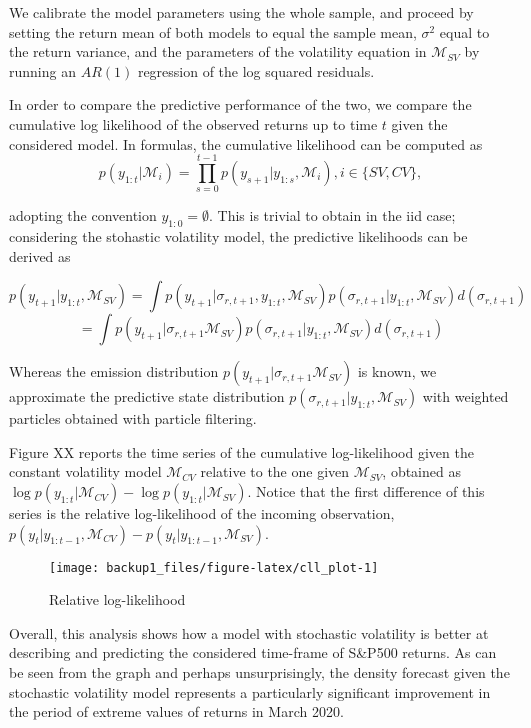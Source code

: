 \documentclass[
]{book}
\theoremstyle{break}
\theoremstyle{nonumberplain}
\begin{document}
We calibrate the model parameters using the whole sample, and proceed by
setting the return mean of both models to equal the sample mean,
\(\sigma^{2}\) equal to the return variance, and the parameters of the
volatility equation in \(\mathcal{M}_{SV}\) by running an \(AR(1)\)
regression of the log squared residuals.

In order to compare the predictive performance of the two, we compare
the cumulative log likelihood of the observed returns up to time \(t\)
given the considered model. In formulas, the cumulative likelihood can
be computed as \[
p(y_{1:t}|\mathcal{M}_{i})=\prod_{s=0}^{t-1}p(y_{s+1}|y_{1:s},\mathcal{M}_{i}),i\in\{SV,CV\},
\]

adopting the convention \(y_{1:0}=\emptyset\). This is trivial to obtain
in the iid case; considering the stohastic volatility model, the
predictive likelihoods can be derived as

\[
p(y_{t+1}|y_{1:t},\mathcal{M}_{SV})=\int p(y_{t+1}|\sigma_{r,t+1},y_{1:t},\mathcal{M}_{SV})p(\sigma_{r,t+1}|y_{1:t},\mathcal{M}_{SV})d(\sigma_{r,t+1})
\] \[
=\int p(y_{t+1}|\sigma_{r,t+1}\mathcal{M}_{SV})p(\sigma_{r,t+1}|y_{1:t},\mathcal{M}_{SV})d(\sigma_{r,t+1})
\]

Whereas the emission distribution
\(p(y_{t+1}|\sigma_{r,t+1}\mathcal{M}_{SV})\) is known, we approximate
the predictive state distribution
\(p(\sigma_{r,t+1}|y_{1:t},\mathcal{M}_{SV})\) with weighted particles
obtained with particle filtering.

Figure XX reports the time series of the cumulative log-likelihood given
the constant volatility model \(\mathcal{M}_{CV}\) relative to the one
given \(\mathcal{M}_{SV}\), obtained as
\(\log p(y_{1:t}|\mathcal{M}_{CV})-\log p(y_{1:t}|\mathcal{M}_{SV})\).
Notice that the first difference of this series is the relative
log-likelihood of the incoming observation,
\(p(y_{t}|y_{1:t-1},\mathcal{M}_{CV})-p(y_{t}|y_{1:t-1},\mathcal{M}_{SV})\).

\begin{figure}[H]

{\centering \texttt{[image: backup1\_files/figure-latex/cll\_plot-1]} 

}

\caption{Relative log-likelihood}\label{fig:cll_plot}
\end{figure}

Overall, this analysis shows how a model with stochastic volatility is
better at describing and predicting the considered time-frame of S\&P500
returns. As can be seen from the graph and perhaps unsurprisingly, the
density forecast given the stochastic volatility model represents a
particularly significant improvement in the period of extreme values of
returns in March 2020.

\backmatter
\end{document}
